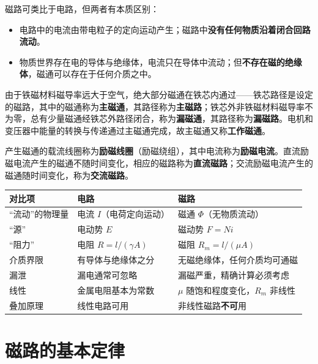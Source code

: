 磁路可类比于电路，但两者有本质区别：
\begin{itemize}
  \item 电路中的电流由带电粒子的定向运动产生；磁路中\textbf{没有任何物质沿着闭合回路流动}。
  \item 物质世界存在电的导体与绝缘体，电流只在导体中流动；但\textbf{不存在磁的绝缘体}，磁通可以存在于任何介质之中。
\end{itemize}

由于铁磁材料磁导率远大于空气，绝大部分磁通在铁芯内通过——铁芯路径是设定的磁路，其中的磁通称为\textbf{主磁通}，其路径称为\textbf{主磁路}；铁芯外非铁磁材料磁导率不为零，总有少量磁通经铁芯外路径闭合，称为\textbf{漏磁通}，其路径称为\textbf{漏磁路}。电机和变压器中能量的转换与传递通过主磁通完成，故主磁通又称\textbf{工作磁通}。

产生磁通的载流线圈称为\textbf{励磁线圈}（励磁绕组），其中电流称为\textbf{励磁电流}。直流励磁电流产生的磁通不随时间变化，相应的磁路称为\textbf{直流磁路}；交流励磁电流产生的磁通随时间变化，称为\textbf{交流磁路}。

\begin{center}
\begin{tabular}{@{}p{2.4cm}p{4.9cm}p{5.6cm}@{}}
\toprule
对比项 & 电路 & 磁路 \\
\midrule
“流动”的物理量 & 电流 $I$（电荷定向运动） & 磁通 $\Phi$（无物质流动） \\
“源” & 电动势 $E$ & 磁动势 $F=Ni$ \\
“阻力” & 电阻 $R=l/(\gamma A)$ & 磁阻 $R_m=l/(\mu A)$ \\
介质界限 & 有导体与绝缘体之分 & 无磁绝缘体，任何介质均可通磁 \\
漏泄 & 漏电通常可忽略 & 漏磁严重，精确计算必须考虑 \\
线性 & 金属电阻基本为常数 & $\mu$ 随饱和程度变化，$R_m$ 非线性 \\
叠加原理 & 线性电路可用 & 非线性磁路\textbf{不可}用 \\
\bottomrule
\end{tabular}
\end{center}


\section{磁路的基本定律}

